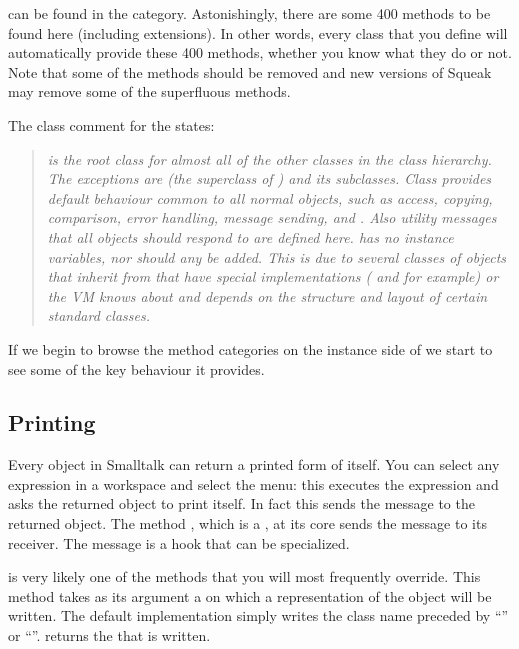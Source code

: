 \documentclass[a4paper,10pt,twoside]{book}
\begin{document}
 can be found in the  category. Astonishingly, there are some 400 methods to be found here (including extensions).  In other words, every class that you define will automatically provide these 400 methods, whether you know what they do or not. Note that some of the methods should be removed and new versions of Squeak may remove some of the superfluous methods. 

The class comment for the  states:

\begin{quote}
\textit{ is the root class for almost all of the other classes in the class hierarchy. The exceptions are  (the superclass of ) and its subclasses.
Class  provides default behaviour common to all normal objects, such as access, copying, comparison, error handling, message sending, and . Also utility messages that all objects should respond to are defined here.
 has no instance variables, nor should any be added. This is due to several classes of objects that inherit from  that have special implementations ( and  for example) or the VM knows about and depends on the structure and layout of certain standard classes.}
\end{quote}

If we begin to browse the method categories on the instance side of  we start to see some of the key behaviour it provides.

\subsection{Printing}
Every object in Smalltalk can return a printed form of itself. You can select any expression in a workspace and select the  menu: this executes the expression and asks the returned object to print itself. In fact this sends the message  to the returned object. The method , which is a , at its core sends the message  to its receiver. The message  is a hook that can be specialized. 

 is very likely one of the methods that you will most frequently override. This method takes as its argument a  on which a  representation of the object will be written. The default implementation simply writes the class name preceded by ``'' or ``''.  returns the  that is written.
\end{document}
